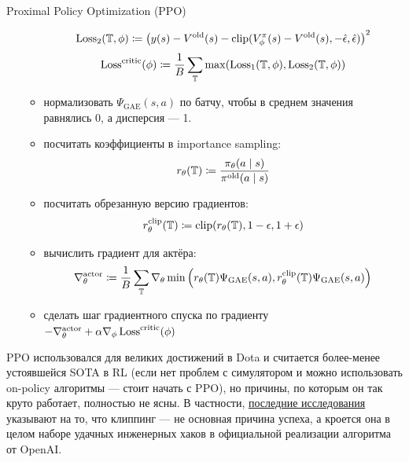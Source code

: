\begin{algorithm}[label = PPOalgorithm]{Proximal Policy Optimization (PPO)}
\begin{enumerate}
\begin{itemize}
    $$\operatorname{Loss}_2(\mathbb{T}, \phi) \coloneqq \left( y(s) - V^{\mathrm{old}}(s) - \mathrm{clip}(V^\pi_\phi(s) - V^{\mathrm{old}}(s), -\hat{\epsilon}, \hat{\epsilon}) \right) ^2$$
    $$\operatorname{Loss}^{\mathrm{critic}}(\phi) \coloneqq \frac{1}{B}\sum_{\mathbb{T}} \max(\operatorname{Loss}_1(\mathbb{T}, \phi), \operatorname{Loss}_2(\mathbb{T}, \phi))$$
    \item нормализовать $\Psi_{\mathrm{GAE}}(s, a)$ по батчу, чтобы в среднем значения равнялись 0, а дисперсия --- 1.
    \item посчитать коэффициенты в importance sampling:
    $$r_\theta(\mathbb{T}) \coloneqq \frac{\pi_\theta(a \mid s)}{\pi^{\mathrm{old}}(a \mid s)}$$
    \item посчитать обрезанную версию градиентов:
    $$r_\theta^{\mathrm{clip}}(\mathbb{T}) \coloneqq \mathrm{clip}(r_\theta(\mathbb{T}), 1 - \epsilon, 1 + \epsilon)$$
    \item вычислить градиент для актёра:
    $$\nabla^{\mathrm{actor}}_\theta \coloneqq \frac{1}{B}\sum_{\mathbb{T}} \nabla_\theta \min \left( r_\theta(\mathbb{T})\Psi_{\mathrm{GAE}}(s, a), r_\theta^{\mathrm{clip}}(\mathbb{T})\Psi_{\mathrm{GAE}}(s, a) \right) $$
    \item сделать шаг градиентного спуска по градиенту $-\nabla^{\mathrm{actor}}_\theta + \alpha \nabla_\phi \operatorname{Loss}^{\mathrm{critic}}(\phi)$
    \end{itemize}
\end{enumerate}
\end{algorithm}

\begin{remark}
PPO использовался для великих достижений в Dota и считается более-менее устоявшейся SOTA в RL (если нет проблем с симулятором и можно использовать on-policy алгоритмы --- стоит начать с PPO), но причины, по которым он так круто работает, полностью не ясны. В частности, \href{https://openreview.net/forum?id=r1etN1rtPB}{последние исследования} указывают на то, что клиппинг --- не основная причина успеха, а кроется она в целом наборе удачных инженерных хаков в официальной реализации алгоритма от OpenAI.
\end{remark}

